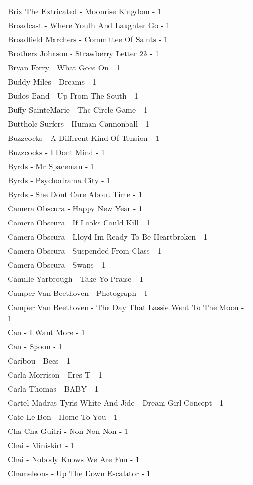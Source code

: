 \documentclass[
]{article}
\begin{document}
\begin{longtable}{l}
Brix The Extricated - Moonrise Kingdom - 1 \\ 
Broadcast - Where Youth And Laughter Go - 1 \\ 
Broadfield Marchers - Committee Of Saints - 1 \\ 
Brothers Johnson - Strawberry Letter 23 - 1 \\ 
Bryan Ferry - What Goes On - 1 \\ 
Buddy Miles - Dreams - 1 \\ 
Budos Band - Up From The South - 1 \\ 
Buffy SainteMarie - The Circle Game - 1 \\ 
Butthole Surfers - Human Cannonball - 1 \\ 
Buzzcocks - A Different Kind Of Tension - 1 \\ 
Buzzcocks - I Dont Mind - 1 \\ 
Byrds - Mr Spaceman - 1 \\ 
Byrds - Psychodrama City - 1 \\ 
Byrds - She Dont Care About Time - 1 \\ 
Camera Obscura - Happy New Year - 1 \\ 
Camera Obscura - If Looks Could Kill - 1 \\ 
Camera Obscura - Lloyd Im Ready To Be Heartbroken - 1 \\ 
Camera Obscura - Suspended From Class - 1 \\ 
Camera Obscura - Swans - 1 \\ 
Camille Yarbrough - Take Yo Praise - 1 \\ 
Camper Van Beethoven - Photograph - 1 \\ 
Camper Van Beethoven - The Day That Lassie Went To The Moon - 1 \\ 
Can - I Want More - 1 \\ 
Can - Spoon - 1 \\ 
Caribou - Bees - 1 \\ 
Carla Morrison - Eres T - 1 \\ 
Carla Thomas - BABY - 1 \\ 
Cartel Madras Tyris White And Jide - Dream Girl Concept - 1 \\ 
Cate Le Bon - Home To You - 1 \\ 
Cha Cha Guitri - Non Non Non - 1 \\ 
Chai - Miniskirt - 1 \\ 
Chai - Nobody Knows We Are Fun - 1 \\ 
Chameleons - Up The Down Escalator - 1 \\ 

\end{longtable}
\end{document}
